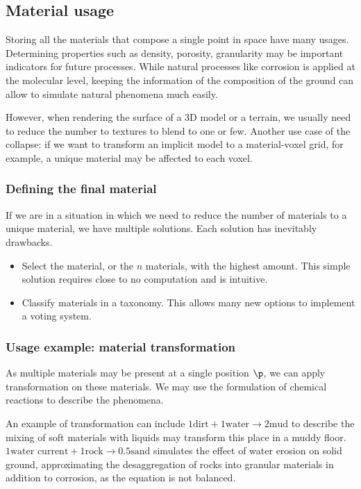 \subsection{Material usage}
Storing all the materials that compose a single point in space have many usages. Determining properties such as density, porosity, granularity may be important indicators for future processes. While natural processes like corrosion is applied at the molecular level, keeping the information of the composition of the ground can allow to simulate natural phenomena much easily.

However, when rendering the surface of a 3D model or a terrain, we usually need to reduce the number to textures to blend to one or few. Another use case of the collapse: if we want to transform an implicit model to a material-voxel grid, for example, a unique material may be affected to each voxel.

\subsubsection{Defining the final material}
If we are in a situation in which we need to reduce the number of materials to a unique material, we have multiple solutions. Each solution has inevitably drawbacks.
\begin{itemize}
    \item Select the material, or the $n$ materials, with the highest amount. This simple solution requires close to no computation and is intuitive.
    \item Classify materials in a taxonomy. This allows many new options to implement a voting system.
\end{itemize}

\subsubsection{Usage example: material transformation}
As multiple materials may be present at a single position $\p$, we can apply transformation on these materials. We may use the formulation of chemical reactions to describe the phenomena.

An example of transformation can include $1 \text{dirt} + 1 \text{water} \to 2 \text{mud}$ to describe the mixing of soft materials with liquids may transform this place in a muddy floor. $1 \text{water current} + 1 \text{rock} \to 0.5 \text{sand}$ simulates the effect of water erosion on solid ground, approximating the desaggregation of rocks into granular materials in addition to corrosion, as the equation is not balanced. 

